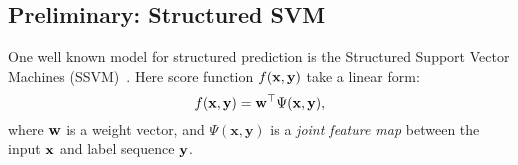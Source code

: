 

\subsection{Preliminary: Structured SVM}
\label{ssec:ssvm}

One well known model for structured prediction is the Structured Support Vector Machines (SSVM)~\cite{joachims2009predicting,tsochantaridis2005large}. 
Here score function $f(\mathbf{x}, \mathbf{y})$ take a linear form:
\begin{equation*}
f(\mathbf{x}, \mathbf{y}) = \mathbf{w}^\top \Psi(\mathbf{x}, \mathbf{y}),
\end{equation*}
where $\mathbf{w}$ is a weight vector, and $\Psi(\mathbf{x}, \mathbf{y})$ is a \emph{joint feature map} 
between the input $\mathbf{x}$ and label sequence $\mathbf{y}$.

